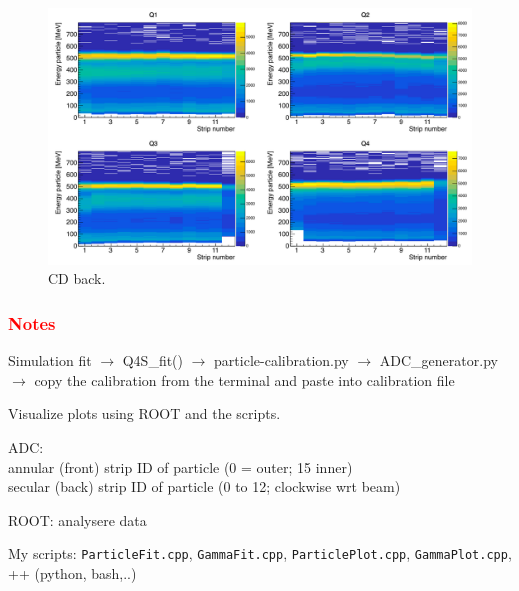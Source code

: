\documentclass[twoside,english]{uiofysmaster/uiofysmaster}
\begin{document}
\begin{figure}[ht]
	\centering
	\includegraphics[width=\textwidth]{../Plots/plotting/E_vs_b-strip_all_Q.png}
	\caption{CD back.}
	\label{fig:cal_CD_back}
\end{figure}








\subsubsection*{\textcolor{red}{Notes}}


Simulation fit $\rightarrow$ Q4S\_fit() $\rightarrow$ particle-calibration.py $\rightarrow$  ADC\_generator.py $\rightarrow$ copy the calibration from the terminal and paste into calibration file 

Visualize plots using ROOT and the scripts. 

\bigskip


ADC: \\
annular (front) strip ID of particle (0 = outer; 15 inner) \\
secular (back) strip ID of particle (0 to 12; clockwise wrt beam) \\



\bigskip

ROOT: analysere data \cite{ROOT}


\bigskip


My scripts: \texttt{ParticleFit.cpp},  \texttt{GammaFit.cpp}, \texttt{ParticlePlot.cpp}, \texttt{GammaPlot.cpp}, ++ (python, bash,..)
\end{document}
